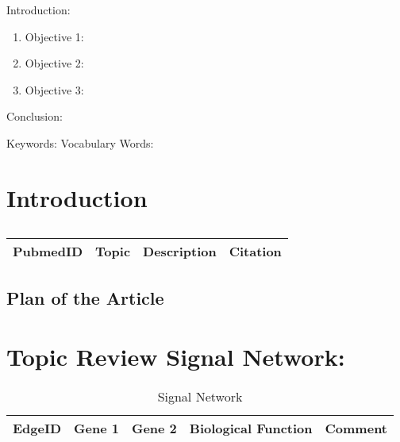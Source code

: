 

\twocolumn
\scriptsize
\begin{frontmatter}
		\title{}
		\author{}
		\address{The Mathematical Learning Space}
\end{frontmatter}	

Introduction:
\begin{enumerate}
\item Objective 1:
\item Objective 2:
\item Objective 3:
\end{enumerate}
Conclusion:

Keywords: 
Vocabulary Words:

\section{Introduction}

\centering	
\begin{table}[H]\tiny
	\caption{}	
	\begin{tabular}{rp{1cm}|p{4cm}|l}
		\hline	
		PubmedID & Topic & Description & Citation \\
		\hline 
		\hline 
	\end{tabular}
\end{table}

\subsection{Plan of the Article}

\section{Topic Review Signal Network:}

\begin{table}[H]
\tiny
\begin{tabular}{p{1cm}p{1cm}p{3cm}p{1cm}p{1cm}} 
EdgeID & Gene 1 & Gene 2 & Biological Function & Comment \\
\hline
\hline
\end{tabular}
\caption{Signal Network}
\label{tab:Table2}
\end{table}

